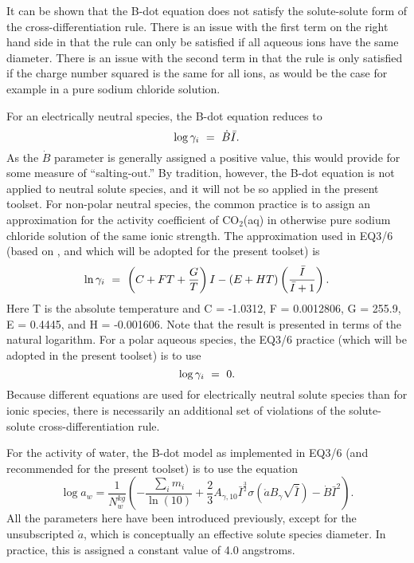 It can be shown that the B-dot equation does not satisfy the
solute-solute form of the cross-differentiation rule. There is an
issue with the first term on the right hand side in that the rule can
only be satisfied if all aqueous ions have the same diameter. There is
an issue with the second term in that the rule is only satisfied if
the charge number squared is the same for all ions, as would be the
case for example in a pure sodium chloride solution.

For an electrically neutral species, the B-dot equation reduces to
%
\begin{equation}
  \log \gamma _{i} \ =\  \dot{B}\bar{I}.
\end{equation}
%
As the $\dot{B}$ parameter is generally assigned a positive value, this
would provide for some measure of ``salting-out.'' By tradition,
however, the B-dot equation is not applied to neutral solute species,
and it will not be so applied in the present toolset. For non-polar
neutral species, the common practice is to assign an approximation for
the activity coefficient of CO$_2$(aq) in otherwise pure sodium chloride
solution of the same ionic strength. The approximation used in EQ3/6
(based on \citet{drummond-1981}, and which will be adopted for the present
toolset) is
%
\begin{equation}
  \ln \gamma_{i} \ =\  \left( C + FT + \frac{G}{T} \right) I 
                  -( E + HT ) \left( \frac{\bar{I}}{\bar{I} + 1} \right).
\end{equation}
%
Here T is the absolute temperature and C = -1.0312, F = 0.0012806, G =
255.9, E = 0.4445, and H = -0.001606. Note that the result is
presented in terms of the natural logarithm.
For a polar aqueous species, the EQ3/6 practice (which will be adopted
in the present toolset) is to use
%
\begin{equation}
\log \gamma _{i} \ =\  0.
\end{equation}
%
Because different equations are used for electrically neutral solute
species than for ionic species, there is necessarily an additional set
of violations of the solute-solute cross-differentiation rule.

For the activity of water, the B-dot model as implemented in EQ3/6
(and recommended for the present toolset) is to use the equation
%
\begin{equation}
   \log a_{w} 
   = \frac{1}{N_{w}^{kg}} 
     \left( - \frac{\sum _{i}m_{i}}{\ln (10)} 
            + \frac{2}{3} A_{\gamma ,10} \bar{I}^{\frac{3}{2}} 
              \sigma( {\mathring{a}} B_{\gamma} \sqrt{\bar{I}} )
            - \dot{B}\bar{I}^{2} 
     \right).
\end{equation}
%
All the parameters here have been introduced previously, except for
the unsubscripted $\mathring{a}$, which is conceptually an effective solute species
diameter. In practice, this is assigned a constant value of 4.0
angstroms.

